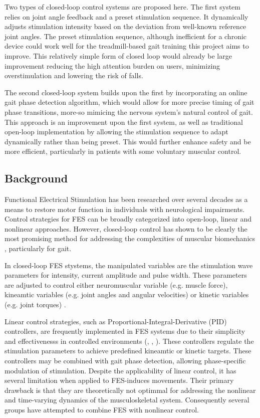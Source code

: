 Two types of closed-loop control systems are proposed here. The first system relies on joint angle feedback and a preset stimulation sequence. It dynamically adjusts stimulation intensity based on the deviation from well-known reference joint angles. The preset stimulation sequence, although inefficient for a chronic device could work well for the treadmill-based gait training this project aims to improve. This relatively simple form of closed loop would already be large improvement reducing the high attention burden on users, minimizing overstimulation and lowering the risk of falls.  

The second closed-loop system builds upon the first by incorporating an online gait phase detection algorithm, which would allow for more precise timing of gait phase transitions, more-so mimicing the nervous system's natural control of gait. This approach is an improvement upon the first system, as well as traditional open-loop implementation by allowing the stimulation sequence to adapt dynamically rather than being preset. This would further enhance safety and be more efficient, particularly in patients with some voluntary muscular control.

\subsection{Background}
Functional Electrical Stimulation has been researched over several decades as a means to restore motor function in individuals with neurological impairments. Control strategies for FES can be broadly categorized into open-loop, linear and nonlinear approaches. However, closed-loop control has shown to be clearly the most promising method for addressing the complexities of muscular biomechanics \cite{chaikho_transcutaneous_2022}, particularly for gait.

In closed-loop FES stystems, the manipulated variables are the stimulation wave parameters for intensity, current amplitude and pulse width. These parameters are adjusted to control either neuromuscular variable (e.g. muscle force), kineamtic variables (e.g. joint angles and angular velocities) or kinetic variables (e.g. joint torques) \cite{chaikho_transcutaneous_2022}.

Linear control strategies, such as Proportional-Integral-Derivative (PID) controllers, are frequently implemented in FES systems due to their simplicity and effectivenesss in controlled environments (\cite{chaikho_transcutaneous_2022}, \cite{bouri_closed-loop_2018}, \cite{dodson_experimental_2017}). These controllers regulate the stimulation parameters to achieve predefined kineamtic or kinetic targets. These controllers may be combined with gait phase detection, allowing phase-specific modulation of stimulation. Despite the applicability of linear control, it has several limitation when applied to FES-induces movements. Their primary drawback is that they are theoretically not optimmal for addressing the nonlinear and time-varying dynamics of the musculoskeletal system. Consequently several groups have attempted to combine FES with nonlinear control.

